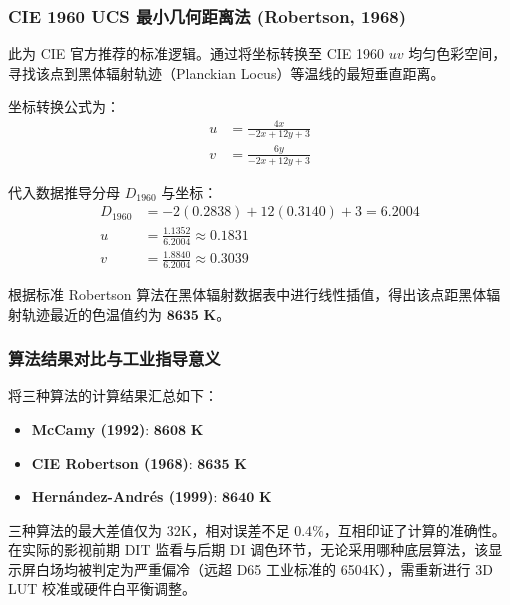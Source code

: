 \documentclass[12pt, a4paper]{ctexart}
\begin{document}
\subsubsection{CIE 1960 UCS 最小几何距离法 (Robertson, 1968)}
此为 CIE 官方推荐的标准逻辑。通过将坐标转换至 CIE 1960 $uv$ 均匀色彩空间，寻找该点到黑体辐射轨迹（Planckian Locus）等温线的最短垂直距离。

坐标转换公式为：
\begin{align}
    u &= \frac{4x}{-2x + 12y + 3} \\
    v &= \frac{6y}{-2x + 12y + 3}
\end{align}

代入数据推导分母 $D_{1960}$ 与坐标：
\begin{align*}
    D_{1960} &= -2(0.2838) + 12(0.3140) + 3 = 6.2004 \\
    u &= \frac{1.1352}{6.2004} \approx \mathbf{0.1831} \\
    v &= \frac{1.8840}{6.2004} \approx \mathbf{0.3039}
\end{align*}

根据标准 Robertson 算法在黑体辐射数据表中进行线性插值，得出该点距黑体辐射轨迹最近的色温值约为 $\mathbf{8635 \text{ K}}$。

\subsubsection{算法结果对比与工业指导意义}
将三种算法的计算结果汇总如下：
\begin{itemize}
    \item \textbf{McCamy (1992)}: $\mathbf{8608 \text{ K}}$
    \item \textbf{CIE Robertson (1968)}: $\mathbf{8635 \text{ K}}$
    \item \textbf{Hernández-Andrés (1999)}: $\mathbf{8640 \text{ K}}$
\end{itemize}
三种算法的最大差值仅为 32K，相对误差不足 $0.4\%$，互相印证了计算的准确性。在实际的影视前期 DIT 监看与后期 DI 调色环节，无论采用哪种底层算法，该显示屏白场均被判定为严重偏冷（远超 D65 工业标准的 6504K），需重新进行 3D LUT 校准或硬件白平衡调整。
\end{document}
